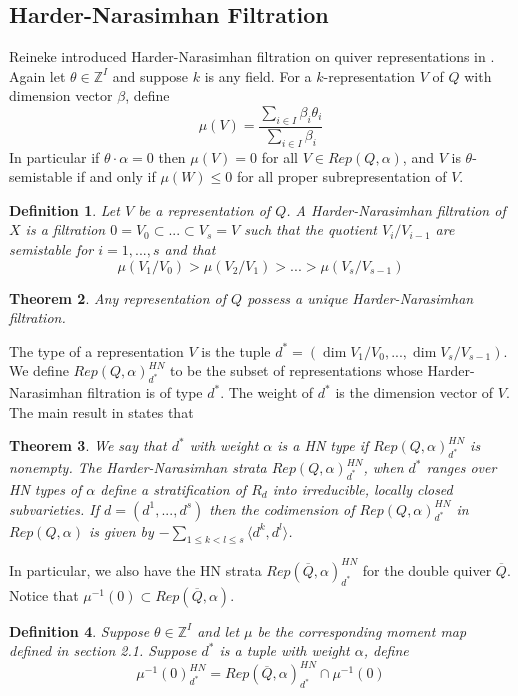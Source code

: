 \documentclass[12pt]{amsart}
\theoremstyle{plain}
\newtheorem{thm}{Theorem}[section]
\newtheorem{defn}[thm]{Definition}
\theoremstyle{definition}
\theoremstyle{remark}
\begin{document}
\subsection{Harder-Narasimhan Filtration}
Reineke introduced Harder-Narasimhan filtration on quiver representations in \cite{reineke2003hn}. Again let $\theta\in\mathbb Z^I$ and suppose $k$ is any field. For a $k$-representation $V$ of $Q$ with dimension vector $\beta$, define
$$\mu(V)=\frac{\displaystyle\sum_{i\in I}\beta_i\theta_i}{\displaystyle \sum_{i\in I}\beta_i}$$
In particular if $\theta\cdot\alpha=0$ then $\mu(V)=0$ for all $V\in Rep(Q,\alpha)$, and $V$ is $\theta$-semistable if and only if $\mu(W)\leq 0$ for all proper subrepresentation of $V$.
\begin{defn}\cite[Definition 2.4]{reineke2003hn} Let $V$ be a representation of $Q$. A Harder-Narasimhan filtration of $X$ is a filtration $0=V_0\subset ...\subset V_s=V$ such that the quotient $V_i/V_{i-1}$ are semistable for $i=1,...,s$ and that 
$$\mu(V_1/V_0)>\mu(V_2/V_1)>...>\mu(V_s/V_{s-1})$$
\end{defn}
\begin{thm}
    \cite[Proposition 2.5]{reineke2003hn} Any representation of $Q$ possess a unique Harder-Narasimhan filtration.
\end{thm}
\hspace{-13pt}The type of a representation $V$ is the tuple $d^*=(\dim V_1/V_0,...,\dim V_s/V_{s-1})$. We define $Rep(Q,\alpha)_{d^*}^{HN}$ to be the subset of representations whose Harder-Narasimhan filtration is of type $d^*$. The weight of $d^*$ is the dimension vector of $V$. The main result in \cite{reineke2003hn} states that
\begin{thm}
    \cite[Proposition 3.4]{reineke2003hn} We say that $d^*$ with weight $\alpha$ is a HN type if $Rep(Q,\alpha)_{d^*}^{HN}$ is nonempty. The Harder-Narasimhan strata $Rep(Q,\alpha)_{d^*}^{HN}$, when $d^*$ ranges over HN types of $\alpha$ define a stratification of $R_d$ into irreducible, locally closed subvarieties. If $d=(d^1,...,d^s)$ then the codimension of $Rep(Q,\alpha)_{d^*}^{HN}$ in $Rep(Q,\alpha)$ is given by $-\sum_{1\leq k<l\leq s}\langle d^k,d^l\rangle$.
\end{thm}

\hspace{-13pt}In particular, we also have the HN strata $Rep(\overline{Q},\alpha)_{d^*}^{HN}$ for the double quiver $\overline{Q}$. Notice that $\mu^{-1}(0)\subset Rep(\overline{Q},\alpha)$.
\begin{defn}
    Suppose $\theta\in\mathbb Z^I$ and let $\mu$ be the corresponding moment map defined in section 2.1. Suppose $d^*$ is a tuple with weight $\alpha$, define
    $$\mu^{-1}(0)_{d^*}^{HN}=Rep(\overline{Q},\alpha)_{d^*}^{HN}\cap\mu^{-1}(0)$$
\end{defn}
\end{document}
